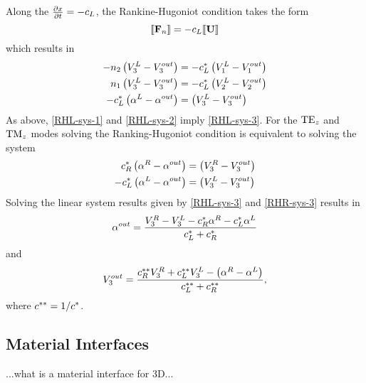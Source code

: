 Along the $\frac{\partial x}{\partial t} = - c_{L}$, the Rankine-Hugoniot condition
takes the form
$$
\llbracket  \mathbf{F}_n  \rrbracket = - c_{L} \llbracket  \mathbf{U}  \rrbracket
$$
which results in
\begin{align}
-n_2 \left(V_3^{L} - V_3^{out} \right) &= - c^{*}_L \left( V_1^{L} - V_1^{out} \right) \label{RHL-sys-1} \\
n_1 \left(V_3^{L} - V_3^{out} \right) &= - c^{*}_L  \left( V_2^{L} - V_2^{out} \right) \label{RHL-sys-2} \\
- c^{*}_L \left( \alpha^{L} - \alpha^{out} \right) &= \left( V_3^{L} - V_3^{out} \right) \label{RHL-sys-3}
\end{align}
As above, \eqref{RHL-sys-1} and \eqref{RHL-sys-2} imply \eqref{RHL-sys-3}.
For the $\textrm{TE}_{z}$ and $\textrm{TM}_{z}$ modes solving the Ranking-Hugoniot condition is equivalent to solving the system
\begin{align}
c^{*}_R \left(\alpha^{R} - \alpha^{out} \right) &= \left( V_3^{R} - V_3^{out} \right) \\
- c^{*}_L \left( \alpha^{L} - \alpha^{out} \right) &= \left( V_3^{L} - V_3^{out} \right)
\end{align}
Solving the linear system results given by \eqref{RHL-sys-3} and
\eqref{RHR-sys-3} results in
\begin{equation}
\alpha^{out} = \frac{V_3^R - V_3^L - c^{*}_R \alpha^R - c^{*}_L \alpha^L}{c^{*}_L + c^{*}_R}\label{eq:interfce-bc-alphaGeneral}
\end{equation}
and
\begin{equation}
  V_3^{out} =
  \frac{
    c^{**}_R V_3^R + c^{**}_L V_3^L - \left(\alpha^R - \alpha^L \right)
  }{
    c^{**}_L + c^{**}_R
    } , \label{eq:interface-bc-V3}
\end{equation}
where $c^{**} = 1 / c^{*}$.


\subsection{Material Interfaces}
...what is a material interface for 3D...


